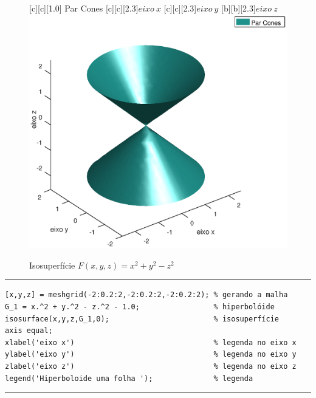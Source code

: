 \begin{figure}[htpb]
\begin{center} 
[c][c][1.0]{\hspace{0.25cm} Par Cones}
[c][c][2.3]{$eixo \ x$}
[c][c][2.3]{$eixo \ y$}
[b][b][2.3]{$eixo \ z$}
\includegraphics*[angle=0,scale=0.5]{imagens/cap2/parcones.eps} \caption{Isosuperfície $F(x,y,z)=x^2+y^2-z^2$} 
\label{fig.cone}
\end{center}
\end{figure}


\begin{Codigo}[htpb]
\noindent\rule{13cm}{1.pt}
\begin{verbatim}
[x,y,z] = meshgrid(-2:0.2:2,-2:0.2:2,-2:0.2:2); % gerando a malha
G_1 = x.^2 + y.^2 - z.^2 - 1.0;                 % hiperbolóide
isosurface(x,y,z,G_1,0);                        % isosuperfície
axis equal;
xlabel('eixo x')                                % legenda no eixo x
ylabel('eixo y')                                % legenda no eixo y
zlabel('eixo z')                                % legenda no eixo z
legend('Hiperboloide uma folha ');              % legenda 
\end{verbatim}
\caption{Código utilizado para gerar a figura \ref{fig.hipumafolha}} 
\noindent\rule{13cm}{1.pt}
\label{supcurvanivelb}
\end{Codigo}

